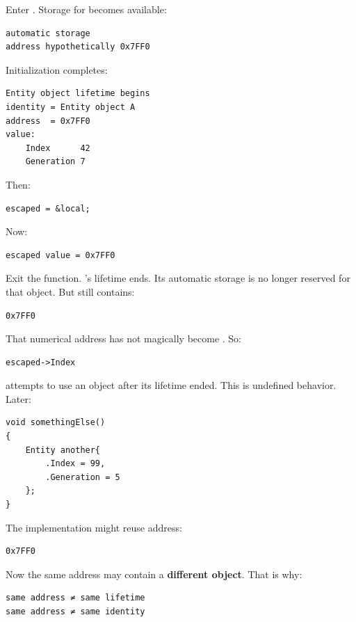 Enter . Storage for  becomes available:

\begin{verbatim}
automatic storage
address hypothetically 0x7FF0
\end{verbatim}

Initialization completes:

\begin{verbatim}
Entity object lifetime begins
identity = Entity object A
address  = 0x7FF0
value:
    Index      42
    Generation 7
\end{verbatim}

Then:

\begin{verbatim}
escaped = &local;
\end{verbatim}

Now:

\begin{verbatim}
escaped value = 0x7FF0
\end{verbatim}

Exit the function. 's lifetime ends. Its automatic storage is no longer reserved for that object. But  still contains:

\begin{verbatim}
0x7FF0
\end{verbatim}

That numerical address has not magically become . So:

\begin{verbatim}
escaped->Index
\end{verbatim}

attempts to use an object after its lifetime ended. This is undefined behavior. Later:

\begin{verbatim}
void somethingElse()
{
    Entity another{
        .Index = 99,
        .Generation = 5
    };
}
\end{verbatim}

The implementation might reuse address:

\begin{verbatim}
0x7FF0
\end{verbatim}

Now the same address may contain a \textbf{different object}. That is why:

\begin{verbatim}
same address ≠ same lifetime
same address ≠ same identity
\end{verbatim}

